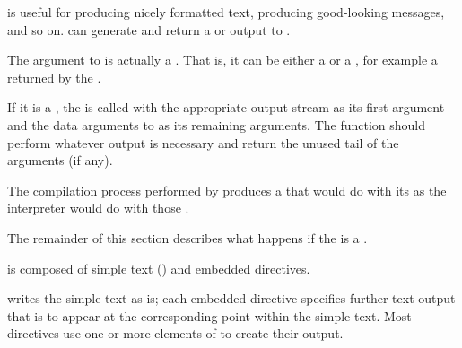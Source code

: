 

 is useful for producing nicely formatted text, producing
good-looking messages, and so on.   can generate and return
a  or output to .

The  argument to  is actually a .
That is, it can be either a  or a ,
for example a  returned
by the  .

If it is a , the  is called with the appropriate
output stream as its first argument and the data arguments to 
as its remaining arguments.  The function should perform whatever output is 
necessary and return the unused tail of the arguments (if any).

The compilation process performed by  produces a 
that would do with its  as the  interpreter
would do with those .

The remainder of this section describes what happens if the 
is a .  



 is composed of simple text () 
and embedded directives.

 writes the simple text as is;
each embedded directive specifies further text output 
that is to appear at the corresponding point within the simple text.  
Most directives use one or more elements of  to
create their output.

